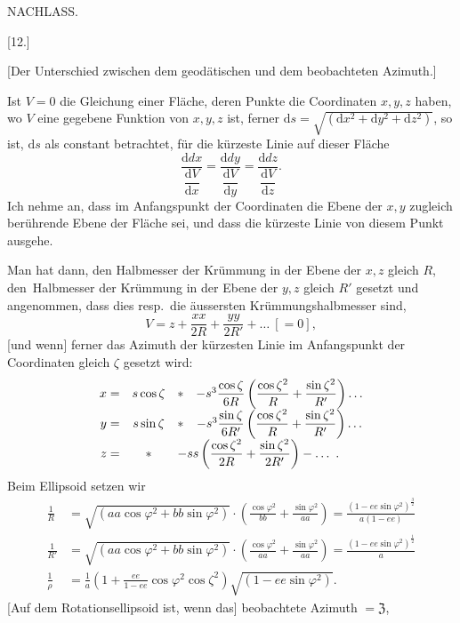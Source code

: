 \clearpage
{}\hfill NACHLASS.\hfill\mbox{}\par
\begin{center}[12.]\end{center}
\begin{center}[Der Unterschied zwischen dem geodätischen und dem beobachteten Azimuth.]\end{center}
Ist $V=0$ die Gleichung einer Fläche, deren Punkte die Coordinaten $x,y,z$ haben, wo $V$ eine gegebene Funktion von $x,y,z$ ist, ferner $\mathrm ds=\sqrt{(\mathrm dx^2+\mathrm dy^2+\mathrm dz^2)}$, so ist, $\mathrm ds$ als constant betrachtet, für die kürzeste Linie auf dieser Fläche
\[
\frac{\mathrm ddx}{\dfrac{\mathrm dV}{\mathrm dx}}=\frac{\mathrm ddy}{\dfrac{\mathrm dV}{\mathrm dy}}=\frac{\mathrm ddz}{\dfrac{\mathrm dV}{\mathrm dz}}.
\]
Ich nehme an, dass im Anfangspunkt der Coordinaten die Ebene der $x,y$ zugleich berührende Ebene der Fläche sei, und dass die kürzeste Linie von diesem Punkt ausgehe.

Man hat dann, den Halbmesser der Krümmung in der Ebene der $x,z$ gleich $R$, den\textperiodcentered\ Halbmesser der Krümmung in der Ebene der $y,z$ gleich $R'$ gesetzt und angenommen, dass dies resp.\ die äussersten Krümmungshalbmesser sind,
\[
V=z+\frac{xx}{2R}+\frac{yy}{2R'}+\ldots\ [=0],
\]
[und wenn] ferner das Azimuth der kürzesten Linie im Anfangspunkt der Coordinaten gleich $\zeta$ gesetzt wird:
\[
\begin{array}{rclcl}
x=&s\cos\zeta&*&-s^3\dfrac{\cos\zeta}{6R}\left(\dfrac{\cos\zeta^2}{R}+\dfrac{\sin\zeta^2}{R'}\right)\ldots\\[4pt]
y=&s\sin\zeta&*&-s^3\dfrac{\sin\zeta}{6R'}\left(\dfrac{\cos\zeta^2}{R}+\dfrac{\sin\zeta^2}{R'}\right)\ldots\\[4pt]
z=&*&\multicolumn{2}{l}{-ss\left(\dfrac{\cos\zeta^2}{2R}+\dfrac{\sin\zeta^2}{2R'}\right)-\ldots\ .}
\end{array}
\]
Beim Ellipsoid setzen wir
\[
\begin{aligned}
\frac1R&=\sqrt{(aa\cos\varphi^2+bb\sin\varphi^2)}\cdot\left(\frac{\cos\varphi^2}{bb}+\frac{\sin\varphi^2}{aa}\right)=\frac{(1-ee\sin\varphi^2)^{\frac32}}{a(1-ee)}\\
\frac1{R'}&=\sqrt{(aa\cos\varphi^2+bb\sin\varphi^2)}\cdot\left(\frac{\cos\varphi^2}{aa}+\frac{\sin\varphi^2}{aa}\right)=\frac{(1-ee\sin\varphi^2)^{\frac12}}a\\
\frac1\rho&=\frac1a\left(1+\frac{ee}{1-ee}\cos\varphi^2\cos\zeta^2\right)\sqrt{(1-ee\sin\varphi^2)}.
\end{aligned}
\]
[Auf dem Rotationsellipsoid ist, wenn das] beobachtete Azimuth $=\mathfrak Z$,

